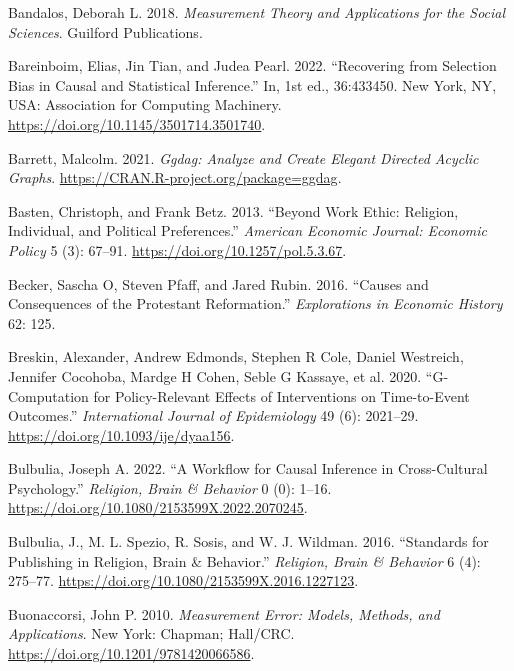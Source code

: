 \documentclass[
  singlecolumn]{report}
\newlength{\cslhangindent}
\newlength{\cslentryspacingunit} %
\newenvironment{CSLReferences}[2] %
 {%
  \setlength{\parindent}{0pt}
  \ifodd #1
  \let\oldpar\par
  \def\par{\hangindent=\cslhangindent\oldpar}
  \fi
  \setlength{\parskip}{#2\cslentryspacingunit}
 }%
 {}
\begin{document}
\hypertarget{refs}{}
\begin{CSLReferences}{1}{0}
\leavevmode{}%
Bandalos, Deborah L. 2018. \emph{Measurement Theory and Applications for
the Social Sciences}. Guilford Publications.

\leavevmode{}%
Bareinboim, Elias, Jin Tian, and Judea Pearl. 2022. {``Recovering from
Selection Bias in Causal and Statistical Inference.''} In, 1st ed.,
36:433450. New York, NY, USA: Association for Computing Machinery.
\url{https://doi.org/10.1145/3501714.3501740}.

\leavevmode{}%
Barrett, Malcolm. 2021. \emph{Ggdag: Analyze and Create Elegant Directed
Acyclic Graphs}. \url{https://CRAN.R-project.org/package=ggdag}.

\leavevmode{}%
Basten, Christoph, and Frank Betz. 2013. {``Beyond Work Ethic: Religion,
Individual, and Political Preferences.''} \emph{American Economic
Journal: Economic Policy} 5 (3): 67--91.
\url{https://doi.org/10.1257/pol.5.3.67}.

\leavevmode{}%
Becker, Sascha O, Steven Pfaff, and Jared Rubin. 2016. {``Causes and
Consequences of the Protestant Reformation.''} \emph{Explorations in
Economic History} 62: 125.

\leavevmode{}%
Breskin, Alexander, Andrew Edmonds, Stephen R Cole, Daniel Westreich,
Jennifer Cocohoba, Mardge H Cohen, Seble G Kassaye, et al. 2020.
{``G-Computation for Policy-Relevant Effects of Interventions on
Time-to-Event Outcomes.''} \emph{International Journal of Epidemiology}
49 (6): 2021--29. \url{https://doi.org/10.1093/ije/dyaa156}.

\leavevmode{}%
Bulbulia, Joseph A. 2022. {``A Workflow for Causal Inference in
Cross-Cultural Psychology.''} \emph{Religion, Brain \& Behavior} 0 (0):
1--16. \url{https://doi.org/10.1080/2153599X.2022.2070245}.

\leavevmode{}%
Bulbulia, J., M. L. Spezio, R. Sosis, and W. J. Wildman. 2016.
{``Standards for Publishing in Religion, Brain \& Behavior.''}
\emph{Religion, Brain \& Behavior} 6 (4): 275--77.
\url{https://doi.org/10.1080/2153599X.2016.1227123}.

\leavevmode{}%
Buonaccorsi, John P. 2010. \emph{Measurement Error: Models, Methods, and
Applications}. New York: Chapman; Hall/CRC.
\url{https://doi.org/10.1201/9781420066586}.


\end{CSLReferences}
\end{document}
